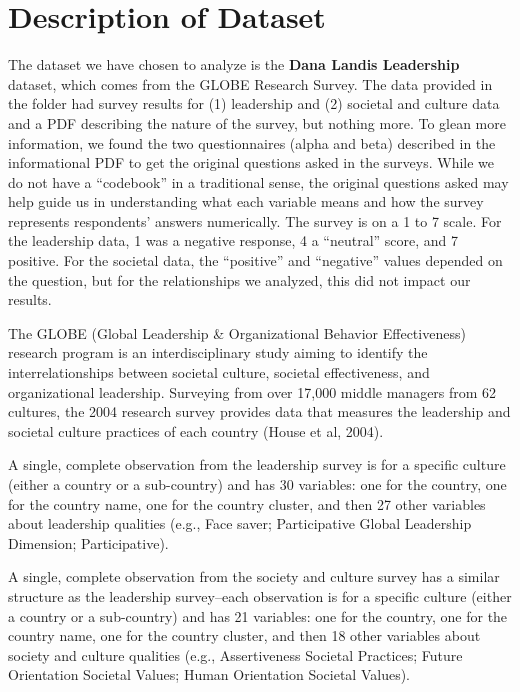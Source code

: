 \documentclass[
]{article}
\begin{document}
\hypertarget{description-of-dataset}{%
\section{Description of Dataset}\label{description-of-dataset}}

The dataset we have chosen to analyze is the \textbf{Dana Landis
Leadership} dataset, which comes from the GLOBE Research Survey. The
data provided in the folder had survey results for (1) leadership and
(2) societal and culture data and a PDF describing the nature of the
survey, but nothing more. To glean more information, we found the two
questionnaires (alpha and beta) described in the informational PDF to
get the original questions asked in the surveys. While we do not have a
``codebook'' in a traditional sense, the original questions asked may
help guide us in understanding what each variable means and how the
survey represents respondents' answers numerically. The survey is on a 1
to 7 scale. For the leadership data, 1 was a negative response, 4 a
``neutral'' score, and 7 positive. For the societal data, the
``positive'' and ``negative'' values depended on the question, but for
the relationships we analyzed, this did not impact our results.

The GLOBE (Global Leadership \& Organizational Behavior Effectiveness)
research program is an interdisciplinary study aiming to identify the
interrelationships between societal culture, societal effectiveness, and
organizational leadership. Surveying from over 17,000 middle managers
from 62 cultures, the 2004 research survey provides data that measures
the leadership and societal culture practices of each country (House et
al, 2004).

A single, complete observation from the leadership survey is for a
specific culture (either a country or a sub-country) and has 30
variables: one for the country, one for the country name, one for the
country cluster, and then 27 other variables about leadership qualities
(e.g., Face saver; Participative Global Leadership Dimension;
Participative).

A single, complete observation from the society and culture survey has a
similar structure as the leadership survey--each observation is for a
specific culture (either a country or a sub-country) and has 21
variables: one for the country, one for the country name, one for the
country cluster, and then 18 other variables about society and culture
qualities (e.g., Assertiveness Societal Practices; Future Orientation
Societal Values; Human Orientation Societal Values).
\end{document}
